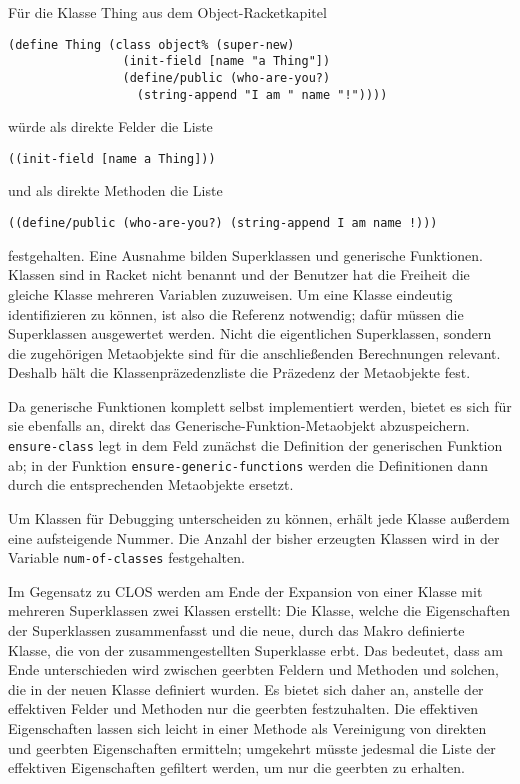 Für die Klasse Thing aus dem Object-Racketkapitel

\begin{lstlisting}
(define Thing (class object% (super-new)
                (init-field [name "a Thing"])
                (define/public (who-are-you?) 
                  (string-append "I am " name "!"))))
\end{lstlisting}

würde als direkte Felder die Liste 

\texttt{{\textquotesingle}((init-field [name {\qq}a Thing\qq]))} 

und als direkte Methoden die Liste 

\texttt{{\textquotesingle}((define/public (who-are-you?) (string-append {\qq}I am {\qq} name \qq!\qq)))} 

festgehalten. Eine Ausnahme bilden Superklassen und generische Funktionen. Klassen sind in Racket nicht benannt und der Benutzer hat die Freiheit die gleiche Klasse mehreren Variablen zuzuweisen. Um eine Klasse eindeutig identifizieren zu können, ist also die Referenz notwendig; dafür müssen die Superklassen ausgewertet werden. Nicht die eigentlichen Superklassen, sondern die zugehörigen Metaobjekte sind für die anschließenden Berechnungen relevant. Deshalb hält die Klassenpräzedenzliste die Präzedenz der Metaobjekte fest. 

Da generische Funktionen komplett selbst implementiert werden, bietet es sich für sie ebenfalls an, direkt das Generische-Funktion-Metaobjekt abzuspeichern. \texttt{ensure-class} legt in dem Feld zunächst die Definition der generischen Funktion ab; in der Funktion \texttt{ensure-generic-functions} werden die Definitionen dann durch die entsprechenden Metaobjekte ersetzt.

Um Klassen für Debugging unterscheiden zu können, erhält jede Klasse außerdem eine aufsteigende Nummer. Die Anzahl der bisher erzeugten Klassen wird in der Variable \texttt{num-of-classes} festgehalten.

Im Gegensatz zu CLOS werden am Ende der Expansion von einer Klasse mit mehreren Superklassen zwei Klassen erstellt: Die Klasse, welche die Eigenschaften der Superklassen zusammenfasst und die neue, durch das Makro definierte Klasse, die von der zusammengestellten Superklasse erbt. Das bedeutet, dass am Ende unterschieden wird zwischen geerbten Feldern und Methoden und solchen, die in der neuen Klasse definiert wurden. Es bietet sich daher an, anstelle der effektiven Felder und Methoden nur die geerbten festzuhalten. Die effektiven Eigenschaften lassen sich leicht in einer Methode als Vereinigung von direkten und geerbten Eigenschaften ermitteln; umgekehrt müsste jedesmal die Liste der effektiven Eigenschaften gefiltert werden, um nur die geerbten zu erhalten. 

